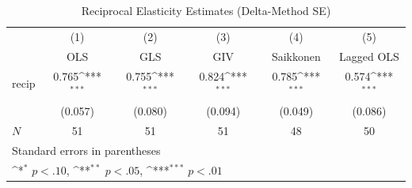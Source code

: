 \begin{table}[htbp]\centering
\def\sym#1{\ifmmode^{#1}\else\(^{#1}\)\fi}
\caption{Reciprocal Elasticity Estimates (Delta-Method SE)}
\begin{tabular}{l*{5}{c}}
\hline\hline
                    &\multicolumn{1}{c}{(1)}&\multicolumn{1}{c}{(2)}&\multicolumn{1}{c}{(3)}&\multicolumn{1}{c}{(4)}&\multicolumn{1}{c}{(5)}\\
                    &\multicolumn{1}{c}{OLS}&\multicolumn{1}{c}{GLS}&\multicolumn{1}{c}{GIV}&\multicolumn{1}{c}{Saikkonen}&\multicolumn{1}{c}{Lagged OLS}\\
\hline
recip               &       0.765\sym{***}&       0.755\sym{***}&       0.824\sym{***}&       0.785\sym{***}&       0.574\sym{***}\\
                    &     (0.057)         &     (0.080)         &     (0.094)         &     (0.049)         &     (0.086)         \\
\hline
\(N\)               &          51         &          51         &          51         &          48         &          50         \\
\hline\hline
\multicolumn{6}{l}{\footnotesize Standard errors in parentheses}\\
\multicolumn{6}{l}{\footnotesize \sym{*} \(p<.10\), \sym{**} \(p<.05\), \sym{***} \(p<.01\)}\\
\end{tabular}
\end{table}
